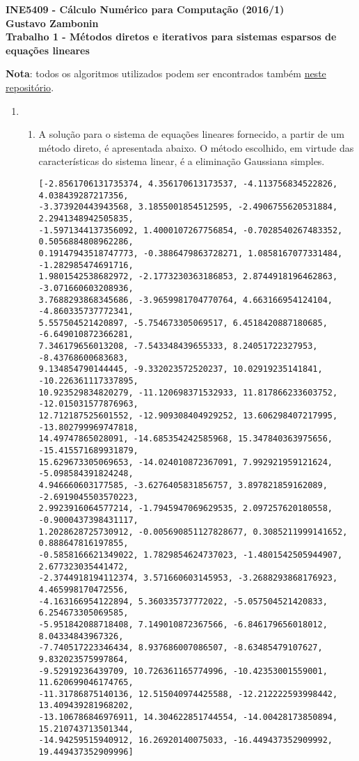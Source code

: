 \documentclass{article}
\newenvironment{arabenum}{
    \begin{enumerate}[label=\textbf{\arabic*})]
}{
    \end{enumerate}
}
\newenvironment{alphenum}{
    \begin{enumerate}[label=(\alph*)]
}{
    \end{enumerate}
}
\begin{document}
{\bf \noindent INE5409 - Cálculo Numérico para Computação (2016/1) \\
Gustavo Zambonin \\
Trabalho 1 - Métodos diretos e iterativos
para sistemas esparsos de equações lineares \\
}

\noindent \textbf{Nota}: todos os algoritmos utilizados podem ser encontrados
também \href{https://github.com/zambonin/ufsc-ine5409}{neste repositório}.

\begin{arabenum}

\item \begin{alphenum}

\item A solução para o sistema de equações lineares fornecido, a partir de um
método direto, é apresentada abaixo. O método escolhido, em virtude das
características do sistema linear, é a eliminação Gaussiana simples.

\begin{verbatim}
[-2.8561706131735374, 4.356170613173537, -4.113756834522826, 4.038439287217356,
-3.373920443943568, 3.1855001854512595, -2.4906755620531884, 2.2941348942505835,
-1.5971344137356092, 1.4000107267756854, -0.7028540267483352, 0.5056884808962286,
0.19147943518747773, -0.3886479863728271, 1.0858167077331484, -1.282985474691716,
1.9801542538682972, -2.1773230363186853, 2.8744918196462863, -3.071660603208936,
3.7688293868345686, -3.9659981704770764, 4.663166954124104, -4.860335737772341,
5.557504521420897, -5.754673305069517, 6.4518420887180685, -6.649010872366281,
7.346179656013208, -7.543348439655333, 8.24051722327953, -8.43768600683683,
9.134854790144445, -9.332023572520237, 10.02919235141841, -10.226361117337895,
10.923529834820279, -11.120698371532933, 11.817866233603752, -12.015031577876963,
12.712187525601552, -12.909308404929252, 13.606298407217995, -13.802799969747818,
14.49747865028091, -14.685354242585968, 15.347840363975656, -15.415571689931879,
15.629673305069653, -14.024010872367091, 7.992921959121624, -5.098584391824248,
4.946660603177585, -3.6276405831856757, 3.897821859162089, -2.6919045503570223,
2.9923916064577214, -1.7945947069629535, 2.097257620180558, -0.9000437398431117,
1.2028628725730912, -0.005690851127828677, 0.3085211999141652, 0.888647816197855,
-0.5858166621349022, 1.7829854624737023, -1.4801542505944907, 2.677323035441472,
-2.3744918194112374, 3.571660603145953, -3.2688293868176923, 4.465998170472556,
-4.163166954122894, 5.360335737772022, -5.057504521420833, 6.254673305069585,
-5.951842088718408, 7.149010872367566, -6.846179656018012, 8.04334843967326,
-7.740517223346434, 8.937686007086507, -8.63485479107627, 9.832023575997864,
-9.52919236439709, 10.726361165774996, -10.42353001559001, 11.620699046174765,
-11.31786875140136, 12.515040974425588, -12.212222593998442, 13.409439281968202,
-13.106786846976911, 14.304622851744554, -14.00428173850894, 15.210743713501344,
-14.94259515940912, 16.26920140075033, -16.449437352909992, 19.449437352909996]
\end{verbatim}


\end{alphenum}
\end{arabenum}
\end{document}
